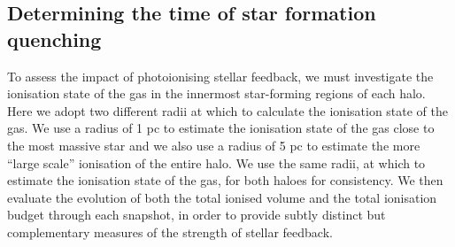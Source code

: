 \documentclass[twocolumn,iop,revtex4]{openjournal}
\begin{document}

\subsection{Determining the time of star formation quenching}\label{cloudy:results}
To assess the impact of photoionising stellar feedback, we must investigate the ionisation state
of the gas in the innermost star-forming regions of each halo.
Here we adopt two different radii at which to calculate the ionisation state of the gas.
We use a radius of 1 pc to estimate the ionisation state of the gas close to the most massive star
and we also use a radius of 5 pc to estimate the more ``large scale'' ionisation of the entire halo. 
We use the same radii, at which to estimate the ionisation state of the gas, for both haloes
for consistency. We then evaluate the evolution of both the total ionised volume and the
total ionisation budget through each snapshot, in order to provide subtly distinct but
complementary measures of the strength of stellar feedback.
\end{document}
